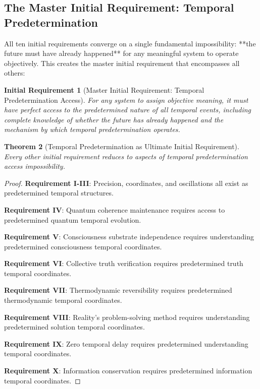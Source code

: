 \documentclass[12pt,a4paper]{article}
\newtheorem{theorem}{Theorem}[section]
\newtheorem{requirement}[theorem]{Initial Requirement}
\begin{document}
{{\subsection{The Master Initial Requirement: Temporal Predetermination}

All ten initial requirements converge on a single fundamental impossibility: **the future must have already happened** for any meaningful system to operate objectively. This creates the master initial requirement that encompasses all others:

\begin{requirement}[Master Initial Requirement: Temporal Predetermination Access]
For any system to assign objective meaning, it must have perfect access to the predetermined nature of all temporal events, including complete knowledge of whether the future has already happened and the mechanism by which temporal predetermination operates.
\end{requirement}

\begin{theorem}[Temporal Predetermination as Ultimate Initial Requirement]
Every other initial requirement reduces to aspects of temporal predetermination access impossibility.
\end{theorem}

\begin{proof}
\textbf{Requirement I-III}: Precision, coordinates, and oscillations all exist as predetermined temporal structures.

\textbf{Requirement IV}: Quantum coherence maintenance requires access to predetermined quantum temporal evolution.

\textbf{Requirement V}: Consciousness substrate independence requires understanding predetermined consciousness temporal coordinates.

\textbf{Requirement VI}: Collective truth verification requires predetermined truth temporal coordinates.

\textbf{Requirement VII}: Thermodynamic reversibility requires predetermined thermodynamic temporal coordinates.

\textbf{Requirement VIII}: Reality's problem-solving method requires understanding predetermined solution temporal coordinates.

\textbf{Requirement IX}: Zero temporal delay requires predetermined understanding temporal coordinates.

\textbf{Requirement X}: Information conservation requires predetermined information temporal coordinates.


\end{proof}}}
\end{document}

